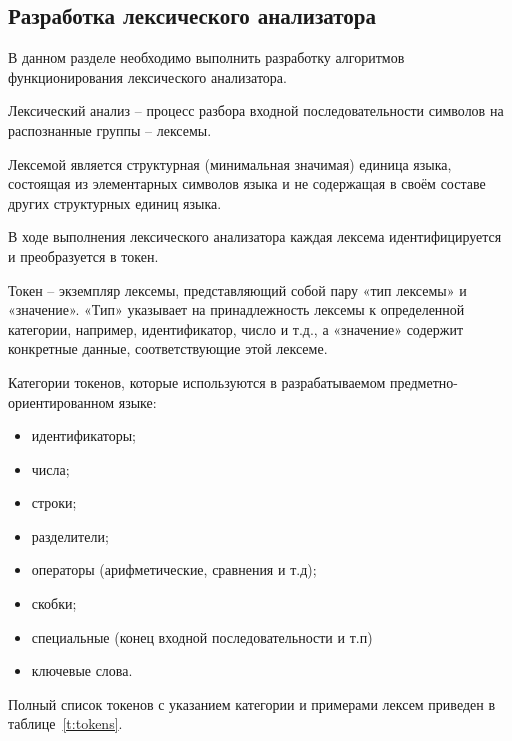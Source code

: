 \subsection{Разработка лексического анализатора}

В данном разделе необходимо выполнить разработку алгоритмов функционирования лексического анализатора.

Лексический анализ – процесс разбора входной последовательности символов на распознанные группы – лексемы.

Лексемой является структурная (минимальная значимая) единица языка, состоящая из элементарных символов языка и не содержащая в своём составе других структурных единиц языка.

В ходе выполнения лексического анализатора каждая лексема идентифицируется и преобразуется в токен.

Токен – экземпляр лексемы, представляющий собой пару «тип лексемы» и «значение».
«Тип» указывает на принадлежность лексемы к определенной категории, например, идентификатор, число и т.д., а «значение» содержит конкретные данные, соответствующие этой лексеме.

Категории токенов, которые используются в разрабатываемом предметно-ориентированном языке:
\begin{itemize}
    \item идентификаторы;
    \item числа;
    \item строки;
    \item разделители;
    \item операторы (арифметические, сравнения и т.д);
    \item скобки;
    \item специальные (конец входной последовательности и т.п)
    \item ключевые слова.
\end{itemize}

Полный список токенов с указанием категории и примерами лексем приведен в таблице~\ref{t:tokens}.

\clearpage


